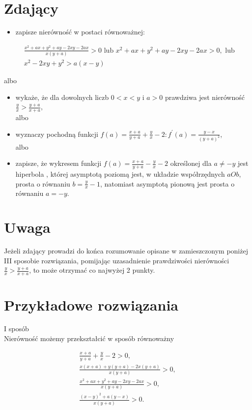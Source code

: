 \documentclass[10pt]{article}
\begin{document}
\section*{Zdający}
\begin{itemize}
  \item zapisze nierówność w postaci równoważnej:
\end{itemize}

$$
\begin{aligned}
& \frac{x^{2}+a x+y^{2}+a y-2 x y-2 a x}{x(y+a)}>0 \text { lub } x^{2}+a x+y^{2}+a y-2 x y-2 a x>0, \text { lub } \\
& x^{2}-2 x y+y^{2}>a(x-y)
\end{aligned}
$$

albo

\begin{itemize}
  \item wykaże, że dla dowolnych liczb $0<x<y$ i $a>0$ prawdziwa jest nierówność $\frac{y}{x}>\frac{y+a}{x+a}$,\\
albo
  \item wyznaczy pochodną funkcji $f(a)=\frac{x+a}{y+a}+\frac{y}{x}-2: f^{\prime}(a)=\frac{y-x}{(y+a)^{2}}$,\\
albo
  \item zapisze, że wykresem funkcji $f(a)=\frac{x+a}{y+a}-\frac{y}{x}-2$ określonej dla $a \neq-y$ jest hiperbola , której asymptotą poziomą jest, w układzie współrzędnych $a O b$, prosta o równaniu $b=\frac{y}{x}-1$, natomiast asymptotą pionową jest prosta o równaniu $a=-y$.
\end{itemize}

\section*{Uwaga}
Jeżeli zdający prowadzi do końca rozumowanie opisane w zamieszczonym poniżej III sposobie rozwiązania, pomijając uzasadnienie prawdziwości nierówności $\frac{y}{x}>\frac{y+a}{x+a}$, to może otrzymać co najwyżej 2 punkty.

\section*{Przykładowe rozwiązania}
I sposób\\
Nierówność możemy przekształcić w sposób równoważny

$$
\begin{gathered}
\frac{x+a}{y+a}+\frac{y}{x}-2>0, \\
\frac{x(x+a)+y(y+a)-2 x(y+a)}{x(y+a)}>0, \\
\frac{x^{2}+a x+y^{2}+a y-2 x y-2 a x}{x(y+a)}>0, \\
\frac{(x-y)^{2}+a(y-x)}{x(y+a)}>0 .
\end{gathered}
$$
\end{document}
